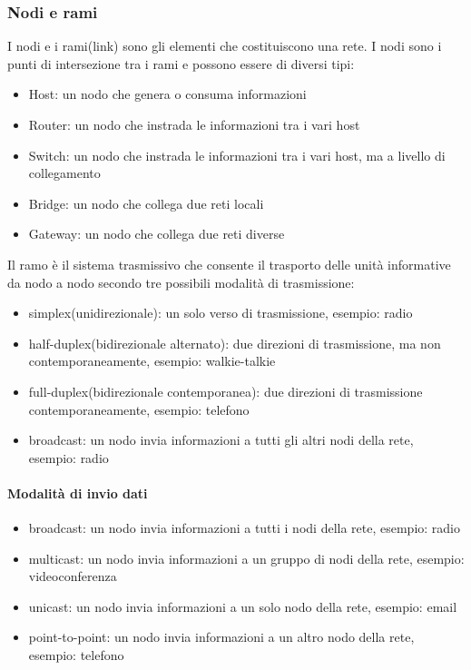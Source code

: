\subsubsection{Nodi e rami}
I nodi e i rami(link) sono gli elementi che costituiscono una rete. I nodi sono i punti di intersezione tra i rami e possono essere di diversi tipi:
\begin{itemize}
    \item Host: un nodo che genera o consuma informazioni
    \item Router: un nodo che instrada le informazioni tra i vari host
    \item Switch: un nodo che instrada le informazioni tra i vari host, ma a livello di collegamento
    \item Bridge: un nodo che collega due reti locali
    \item Gateway: un nodo che collega due reti diverse
\end{itemize}
Il ramo è il sistema trasmissivo che consente il trasporto delle
unità informative da nodo a nodo secondo tre possibili modalità di trasmissione:
\begin{itemize}
    \item simplex(unidirezionale): un solo verso di trasmissione, esempio: radio
    \item half-duplex(bidirezionale alternato): due direzioni di trasmissione, ma non contemporaneamente, esempio: walkie-talkie
    \item full-duplex(bidirezionale contemporanea): due direzioni di trasmissione contemporaneamente, esempio: telefono
    \item broadcast: un nodo invia informazioni a tutti gli altri nodi della rete, esempio: radio
\end{itemize}

\paragraph{Modalità di invio dati}
\begin{itemize}
    \item broadcast: un nodo invia informazioni a tutti i nodi della rete, esempio: radio
    \item multicast: un nodo invia informazioni a un gruppo di nodi della rete, esempio: videoconferenza
    \item unicast: un nodo invia informazioni a un solo nodo della rete, esempio: email
    \item point-to-point: un nodo invia informazioni a un altro nodo della rete, esempio: telefono
\end{itemize}

